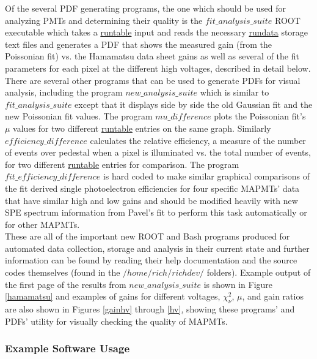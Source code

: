 \documentclass[prc,twocolumn]{revtex4}
\begin{document}
		\indent Of the several PDF generating programs, the one which should be used for analyzing PMTs and determining their quality is the $fit\_analysis\_suite$ ROOT executable which takes a \underline{runtable} input and reads the necessary \underline{rundata} storage text files and generates a PDF that shows the measured gain (from the Poissonian fit) vs. the Hamamatsu data sheet gains as well as several of the fit parameters for each pixel at the different high voltages, described in detail below.  There are several other programs that can be used to generate PDFs for visual analysis, including the program $new\_analysis\_suite$ which is similar to $fit\_analysis\_suite$ except that it displays side by side the old Gaussian fit and the new Poissonian fit values. The program $mu\_difference$ plots the Poissonian fit's $\mu$ values for two different \underline{runtable} entries on the same graph.  Similarly $efficiency\_difference$ calculates the relative efficiency, a measure of the number of events over pedestal when a pixel is illuminated vs. the total number of events, for two different \underline{runtable} entries for comparison.  The program $fit\_efficiency\_difference$ is hard coded to make similar graphical comparisons of the fit derived single photoelectron efficiencies for four specific MAPMTs' data that have similar high and low gains and should be modified heavily with new SPE spectrum information from Pavel's fit to perform this task automatically or for other MAPMTs.  
		\\
		\indent These are all of the important new ROOT and Bash programs produced for automated data collection, storage and analysis in their current state and further information can be found by reading their help documentation and the source codes themselves (found in the $/home/rich/richdev/$ folders).  Example output of the first page of the results from $new\_analysis\_suite$ is shown in Figure \ref{hamamatsu} and examples of gains for different voltages, $\chi^{2}_{\nu}$, $\mu$, and gain ratios are also shown in Figures \ref{gainhv} through \ref{hv}, showing these programs' and PDFs' utility for visually checking the quality of MAPMTs.

	\subsubsection*{Example Software Usage}
		
\end{document}
